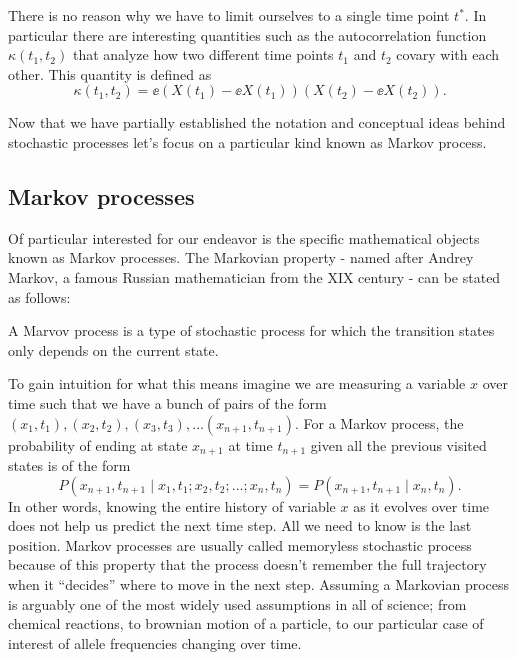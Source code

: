 There is no reason why we have to limit ourselves to a single time point $t^*$.
In particular there are interesting quantities such as the autocorrelation
function $\kappa(t_1, t_2)$ that analyze how two different time points $t_1$
and $t_2$ covary with each other. This quantity is defined as
\begin{equation}
  \kappa(t_1, t_2) = \ee{\left(X(t_1) - \ee{X(t_1)}\right)
                         \left(X(t_2) - \ee{X(t_2)}\right)}.
\end{equation}

Now that we have partially established the notation and conceptual ideas behind
stochastic processes let's focus on a particular kind known as Markov process.

\subsection{Markov processes}
Of particular interested for our endeavor is the specific mathematical objects
known as Markov processes. The Markovian property - named after Andrey Markov, a
famous Russian mathematician from the XIX century - can be stated as follows:
\begin{tcolorbox}
  A Marvov process is a type of stochastic process for which the transition
  states only depends on the current state.
\end{tcolorbox}
To gain intuition for what this means imagine we are measuring a variable $x$
over time such that we have a bunch of pairs of the form $(x_1, t_1), (x_2,
t_2), (x_3, t_3), \ldots (x_{n+1}, t_{n+1})$. For a Markov process, the
probability of ending at state $x_{n+1}$ at time $t_{n+1}$ given all the
previous visited states is of the form
\begin{equation}
  P(x_{n+1}, t_{n+1} \mid x_1, t_1; x_2, t_2; \ldots; x_n, t_n) =
  P(x_{n+1}, t_{n+1} \mid x_n, t_n).
  \label{eq_chapman_kolmogorov}
\end{equation}
In other words, knowing the entire history of variable $x$ as it evolves over
time does not help us predict the next time step. All we need to know is the
last position. Markov processes are usually called memoryless stochastic process
because of this property that the process doesn't remember the full trajectory
when it ``decides'' where to move in the next step. Assuming a Markovian process
is arguably one of the most widely used assumptions in all of science; from
chemical reactions, to brownian motion of a particle, to our particular case of
interest of allele frequencies changing over time.

